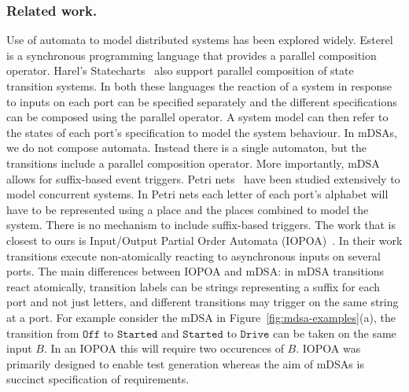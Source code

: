 \subsubsection*{Related work.}
Use of automata to model distributed systems has been explored widely.
Esterel~\cite{DBLP:journals/scp/BerryG92} is a synchronous programming language
that provides a parallel composition operator. Harel's
Statecharts~\cite{DBLP:journals/scp/Harel87} also support parallel composition
of state transition systems. In both these languages the reaction of a system
in response to inputs on each port can be specified separately and the
different specifications can be composed using the parallel operator. A system
model can then refer to the states of each port's specification to model the
system behaviour. In mDSAs, we do not compose automata. Instead there is a single automaton, but the transitions include a parallel composition operator. More importantly, mDSA allows for suffix-based event triggers. %
Petri nets~\cite{CAPetri}
have been studied extensively to model concurrent systems. In Petri nets each
letter of each port's alphabet will have to be represented using a place and
the places combined to model the system. There is no mechanism to include suffix-based triggers. %
The work that is closest to ours is Input/Output Partial Order
Automata (IOPOA)~\cite{10.5555/2391293.2391305}. In their work transitions
execute non-atomically reacting to asynchronous inputs on several ports. The
main differences between IOPOA and mDSA: in mDSA transitions react
atomically, transition labels can be strings representing a suffix for each port and not just letters,
and different transitions may trigger on the same string at a port. For example consider the mDSA in Figure~\ref{fig:mdsa-examples}(a), the transition from $\mathtt{Off}$ to $\mathtt{Started}$ and $\mathtt{Started}$ to $\mathtt{Drive}$ can be taken on the same input $B$. In an IOPOA this will require two occurences of $B$. IOPOA was primarily designed to enable test generation whereas the aim of mDSAs is succinct specification of requirements.
